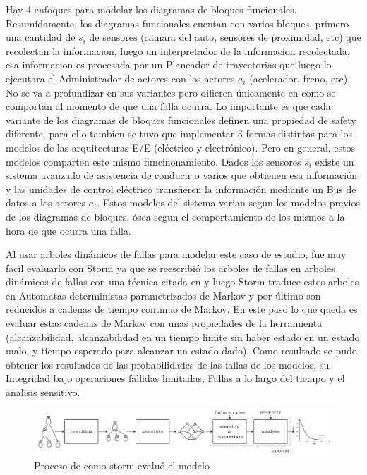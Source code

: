 \documentclass[11pt]{article}
\begin{document}
Hay 4 enfoques para modelar los diagramas de bloques funcionales. Resumidamente, los diagramas funcionales cuentan con varios bloques, primero una cantidad de $s_i$ de sensores (camara del auto, sensores de proximidad, etc) que recolectan la informacion, luego un interpretador de la informacion recolectada, esa informacion es procesada por un Planeador de trayectorias que luego lo ejecutara el Administrador de actores con los actores $a_i$ (acelerador, freno, etc). No se va a profundizar en sus variantes pero difieren \'unicamente en como se comportan al momento de que una falla ocurra.
Lo importante es que cada variante de los diagramas de bloques funcionales definen una propiedad de safety diferente, para ello tambien se tuvo que implementar 3 formas distintas para los modelos de las arquitecturas E/E (el\'ectrico y electr\'onico). Pero en general, estos modelos comparten este mismo funcinonamiento. Dados los sensores $s_i$ existe un sistema avanzado de asistencia de conducir o varios que obtienen esa informaci\'on y las unidades de control el\'ectrico transfieren la informaci\'on mediante un Bus de datos a los actores $a_i$. Estos modelos del sistema varian segun los modelos previos de los diagramas de bloques, \'osea segun el comportamiento de los mismos a la hora de que ocurra una falla.

Al usar arboles din\'amicos de fallas para modelar este caso de estudio, fue muy fac\'il evaluarlo con Storm ya que se reescribi\'o los arboles de fallas en arboles din\'amicos de fallas con una t\'ecnica citada en \cite{Tree} y luego Storm traduce estos arboles en Automatas deterministas parametrizados de Markov y por \'ultimo son reducidos a cadenas de tiempo continuo de Markov. En este paso lo que queda es evaluar estas cadenas de Markov con unas propiedades de la herramienta (alcanzabilidad, alcanzabilidad en un tiempo limite sin haber estado en un estado malo, y tiempo esperado para alcanzar un estado dado). Como resultado se pudo obtener los resultados de las probabilidades de las fallas de los modelos, su Integridad bajo operaciones fallidas limitadas, Fallas a lo largo del tiempo y el analisis sensitivo. %


\begin{figure}[h]
	\includegraphics[scale=0.3]{stormapproach.png} 
	\centering
	\caption{Proceso de como storm evalu\'o el modelo}%
\end{figure}
\end{document}
